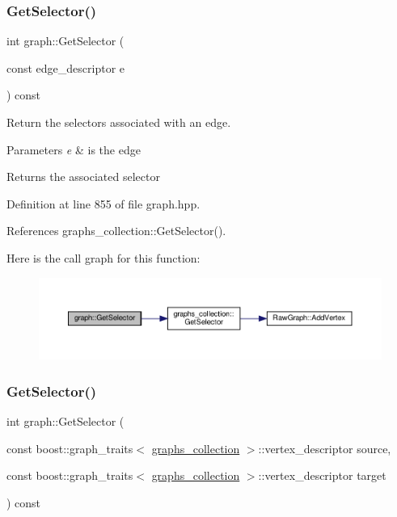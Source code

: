 \subsubsection{\texorpdfstring{Get\+Selector()}{GetSelector()}\hspace{0.1cm}{\footnotesize\ttfamily [2/3]}}
{\footnotesize\ttfamily int graph\+::\+Get\+Selector (\begin{DoxyParamCaption}\item[{const edge\+\_\+descriptor}]{e }\end{DoxyParamCaption}) const\hspace{0.3cm}{\ttfamily [inline]}}



Return the selectors associated with an edge. 


\begin{DoxyParams}{Parameters}
{\em e} & is the edge \\
\hline
\end{DoxyParams}
\begin{DoxyReturn}{Returns}
the associated selector 
\end{DoxyReturn}


Definition at line 855 of file graph.\+hpp.



References graphs\+\_\+collection\+::\+Get\+Selector().

Here is the call graph for this function\+:
\nopagebreak
\begin{figure}[H]
\begin{center}
\leavevmode
\includegraphics[width=350pt]{d5/d15/structgraph_af5ca0d5731ee65e1a05b13baccddd529_cgraph}
\end{center}
\end{figure}
\mbox{\label{structgraph_a5e83fae90882209faaf9d5cf78a40a53}} 
\subsubsection{\texorpdfstring{Get\+Selector()}{GetSelector()}\hspace{0.1cm}{\footnotesize\ttfamily [3/3]}}
{\footnotesize\ttfamily int graph\+::\+Get\+Selector (\begin{DoxyParamCaption}\item[{const boost\+::graph\+\_\+traits$<$ \hyperlink{structgraphs__collection}{graphs\+\_\+collection} $>$\+::vertex\+\_\+descriptor}]{source,  }\item[{const boost\+::graph\+\_\+traits$<$ \hyperlink{structgraphs__collection}{graphs\+\_\+collection} $>$\+::vertex\+\_\+descriptor}]{target }\end{DoxyParamCaption}) const\hspace{0.3cm}{\ttfamily [inline]}}



